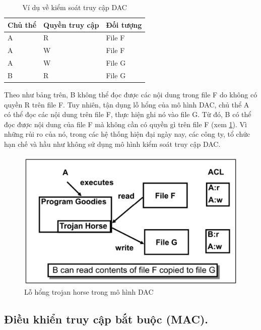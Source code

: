 \begin{table}[ht]
    \centering
    \caption{Ví dụ về kiểm soát truy cập DAC}
    \label{tab:chap2-dac-example}
    \begin{tabular}{| p{} | p{} | p{} |}
        \hline
        \textbf{Chủ thể} & \textbf{Quyền truy cập} & \textbf{Đối tượng} \\
        \hline
        A & R & File F \\
        \hline
        A & W & File F \\
        \hline
        A & W & File G \\
        \hline
        B & R & File G \\
        \hline
    \end{tabular}
\end{table}
Theo như bảng trên, B không thể đọc được các nội dung trong file F do không có
quyền R trên file F. Tuy nhiên, tận dụng lỗ hổng của mô hình DAC, chủ thể A có thể
đọc các nội dung trên file F, thực hiện ghi nó vào file G. Từ đó, B có thể đọc được nội
dung của file F mà không cần có quyền gì trên file F (xem \ref{fig:chap2-troyjan-dac}). Vì những rủi ro của nó, trong các hệ thống hiện đại ngày nay, các công ty, tổ chức hạn chế và hầu như không sử dụng mô hình kiểm soát truy cập DAC. 
\begin{figure}
    \centering
    \includegraphics[scale=0.5]{graphics/chapter-2/chap2-troyjan-dac.png}
    \caption{Lỗ hổng trojan horse trong mô hình DAC \cite{sandhu1996role}}
    \label{fig:chap2-troyjan-dac}
\end{figure}
\subsection{Điều khiển truy cập bắt buộc (MAC).}

